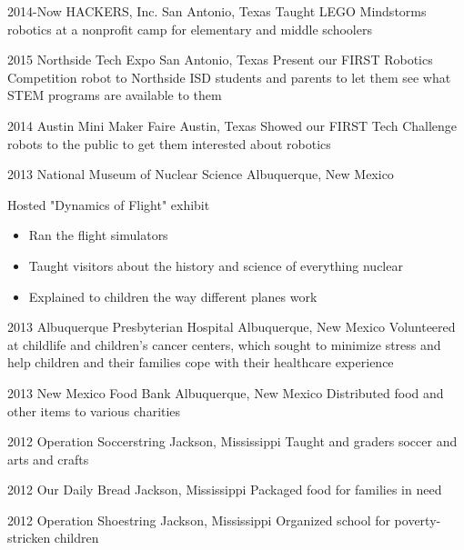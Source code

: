 \documentclass[]{friggeri-cv} %
\begin{document}
\begin{entrylist}


\entry
{2014-Now}
{HACKERS, Inc.}
{San Antonio, Texas}
{Taught LEGO Mindstorms robotics at a nonprofit camp for elementary and middle schoolers}


\entry
{2015}
{Northside Tech Expo}
{San Antonio, Texas}
{Present our FIRST Robotics Competition robot to Northside ISD students and parents to let them see what STEM programs are available to them}


\entry
{2014}
{Austin Mini Maker Faire}
{Austin, Texas}
{Showed our FIRST Tech Challenge robots to the public to get them interested about robotics}


\entry
{2013}
{National Museum of Nuclear Science}
{Albuquerque, New Mexico}
{Hosted "Dynamics of Flight" exhibit 
\begin{itemize}
\item Ran the flight simulators 
\item Taught visitors about the history and science of everything nuclear 
\item Explained to children the way different planes work 
\end{itemize}
}


\entry
{2013}
{Albuquerque Presbyterian Hospital}
{Albuquerque, New Mexico}
{Volunteered at childlife and children's cancer centers, which sought to minimize stress and help children and their families cope with their healthcare experience}

\entry
{2013}
{New Mexico Food Bank}
{Albuquerque, New Mexico}
{Distributed food and other items to various charities}


\entry
{2012}
{Operation Soccerstring}
{Jackson, Mississippi}
{Taught  and  graders soccer and arts and crafts}


\entry
{2012}
{Our Daily Bread}
{Jackson, Mississippi}
{Packaged food for families in need}


\entry
{2012}
{Operation Shoestring}
{Jackson, Mississippi}
{Organized school for poverty-stricken children}


\end{entrylist}
\end{document}
